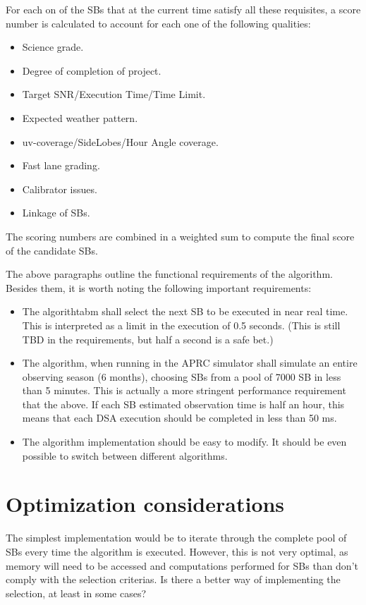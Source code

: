 \documentclass{article}
\begin{document}
For each on of the SBs that at the current time satisfy all these requisites, a
score number is calculated to account for each one of the following qualities: 
\begin{itemize}
\item Science grade.
\item Degree of completion of project.
\item Target SNR/Execution Time/Time Limit.
\item Expected weather pattern.
\item uv-coverage/SideLobes/Hour Angle coverage.
\item Fast lane grading.
\item Calibrator issues.
\item Linkage of SBs.
\end{itemize}
The scoring numbers are combined in a weighted sum to compute the final score of the
candidate SBs.

The above paragraphs outline the functional requirements of the algorithm. Besides them,
it is worth noting the following important requirements:
\begin{itemize}
\item The algorithtabm shall select the next SB to be executed in near real time. This is
interpreted as a limit in the execution of 0.5 seconds. (This is still TBD in the requirements,
but half a second is a safe bet.) 
\item The algorithm, when running in the APRC simulator shall simulate an entire observing
season (6 months), choosing SBs from a pool of 7000 SB in less than 5 minutes. This is actually
a more stringent performance requirement that the above. If each SB estimated observation time is
half an hour, this means that each DSA execution should be completed in less than 50 ms.
\item The algorithm implementation should be easy to modify. It should be even possible to
switch between different algorithms. 
\end{itemize}

\section{Optimization considerations}

The simplest implementation would be to iterate through the
complete pool of SBs every time the algorithm is executed. However, this is not
very optimal, as memory will need to be accessed and computations performed for
SBs than don't comply with the selection criterias.
Is there a better way of implementing the selection, at least in some cases?
\end{document}
